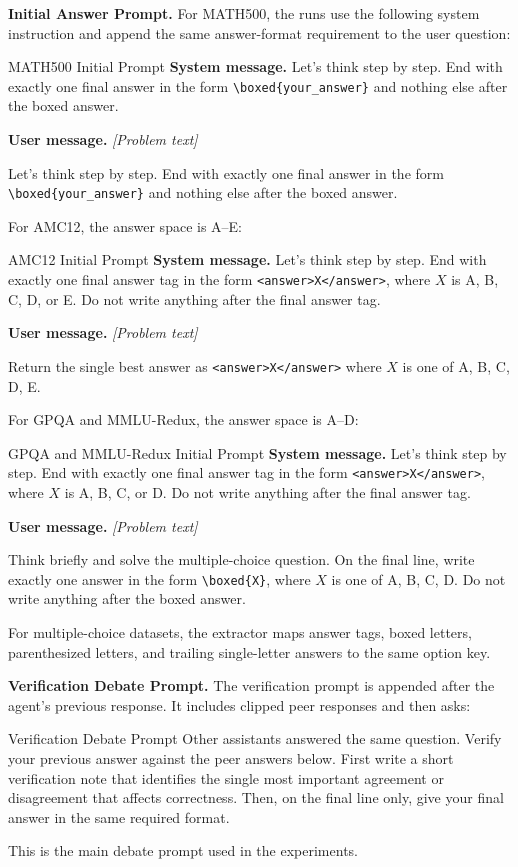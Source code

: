\documentclass{article}
\begin{document}
\textbf{Initial Answer Prompt.}
\label{app:prompt_initial_answer}
For MATH500, the runs use the following system instruction and append the same
answer-format requirement to the user question:
\begin{promptbox}{MATH500 Initial Prompt}
\small
\textbf{System message.}
Let's think step by step. End with exactly one final answer in the form
\texttt{\textbackslash boxed\{your\_answer\}} and nothing else after the boxed answer.

\medskip
\textbf{User message.}
\emph{[Problem text]}

Let's think step by step. End with exactly one final answer in the form
\texttt{\textbackslash boxed\{your\_answer\}} and nothing else after the boxed answer.
\end{promptbox}
For AMC12, the answer space is A--E:
\begin{promptbox}{AMC12 Initial Prompt}
\small
\textbf{System message.}
Let's think step by step. End with exactly one final answer tag in the form
\texttt{<answer>X</answer>}, where $X$ is A, B, C, D, or E. Do not write
anything after the final answer tag.

\medskip
\textbf{User message.}
\emph{[Problem text]}

Return the single best answer as \texttt{<answer>X</answer>} where $X$ is one
of A, B, C, D, E.
\end{promptbox}
For GPQA and MMLU-Redux, the answer space is A--D:
\begin{promptbox}{GPQA and MMLU-Redux Initial Prompt}
\small
\textbf{System message.}
Let's think step by step. End with exactly one final answer tag in the form
\texttt{<answer>X</answer>}, where $X$ is A, B, C, or D. Do not write anything
after the final answer tag.

\medskip
\textbf{User message.}
\emph{[Problem text]}

Think briefly and solve the multiple-choice question. On the final line, write
exactly one answer in the form \texttt{\textbackslash boxed\{X\}}, where $X$ is
one of A, B, C, D. Do not write anything after the boxed answer.
\end{promptbox}
For multiple-choice datasets, the extractor maps answer tags, boxed letters,
parenthesized letters, and trailing single-letter answers to the same option key.

\textbf{Verification Debate Prompt.}
\label{app:prompt_verify_then_answer}
The verification prompt is appended after the agent's previous response. It
includes clipped peer responses and then asks:
\begin{promptbox}{Verification Debate Prompt}
\small
Other assistants answered the same question. Verify your previous answer
against the peer answers below. First write a short verification note that
identifies the single most important agreement or disagreement that affects
correctness. Then, on the final line only, give your final answer in the same
required format.
\end{promptbox}
This is the main debate prompt used in the experiments.
\end{document}
